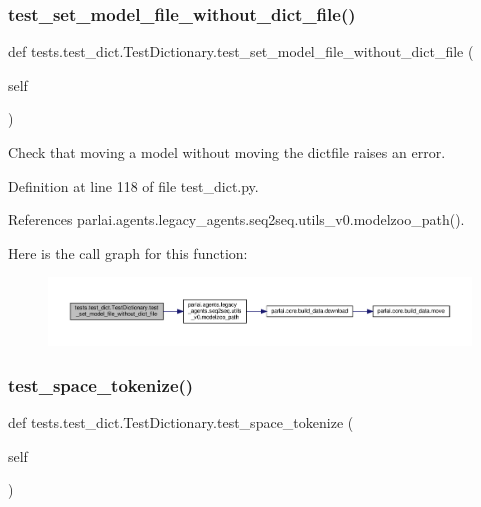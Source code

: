 \subsubsection{\texorpdfstring{test\+\_\+set\+\_\+model\+\_\+file\+\_\+without\+\_\+dict\+\_\+file()}{test\_set\_model\_file\_without\_dict\_file()}}
{\footnotesize\ttfamily def tests.\+test\+\_\+dict.\+Test\+Dictionary.\+test\+\_\+set\+\_\+model\+\_\+file\+\_\+without\+\_\+dict\+\_\+file (\begin{DoxyParamCaption}\item[{}]{self }\end{DoxyParamCaption})}

\begin{DoxyVerb}Check that moving a model without moving the dictfile raises an error.\end{DoxyVerb}
 

Definition at line 118 of file test\+\_\+dict.\+py.



References parlai.\+agents.\+legacy\+\_\+agents.\+seq2seq.\+utils\+\_\+v0.\+modelzoo\+\_\+path().

Here is the call graph for this function\+:
\nopagebreak
\begin{figure}[H]
\begin{center}
\leavevmode
\includegraphics[width=350pt]{classtests_1_1test__dict_1_1TestDictionary_a6c7dcec12a72ba52852f7b214d4783bf_cgraph}
\end{center}
\end{figure}
\mbox{\label{classtests_1_1test__dict_1_1TestDictionary_aa586d6cf97a48027ee00ed74234acb11}} 
\subsubsection{\texorpdfstring{test\+\_\+space\+\_\+tokenize()}{test\_space\_tokenize()}}
{\footnotesize\ttfamily def tests.\+test\+\_\+dict.\+Test\+Dictionary.\+test\+\_\+space\+\_\+tokenize (\begin{DoxyParamCaption}\item[{}]{self }\end{DoxyParamCaption})}

